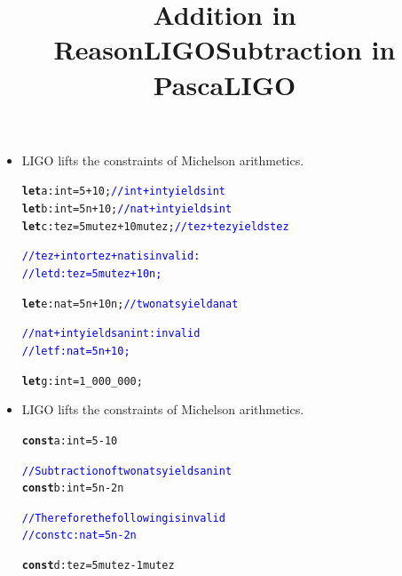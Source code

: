 \documentclass[wide]{slides}
\newcommand{\Kconst}[0]{\textbf{const}\xspace}
\newcommand{\Klet}[0]{\textbf{let}\xspace}
\newcommand{\com}[1]{\textcolor{blue}{{#1}}}
\begin{document}
\begin{slide}
  \title{Addition in ReasonLIGO}

  \begin{itemize}

    \item LIGO lifts the constraints of Michelson arithmetics.

      \begin{alltt}
\Klet a : int = 5 + 10;             \com{// int + int yields int}
\Klet b : int = 5n + 10;            \com{// nat + int yields int}
\Klet c : tez = 5mutez + 10mutez; \com{// tez + tez yields tez}

\com{// tez + int or tez + nat is invalid:}
\com{// let d : tez = 5mutez + 10n;}

\Klet e : nat = 5n + 10n;  \com{// two nats yield a nat}

\com{// nat + int yields an int: invalid}
\com{// let f : nat = 5n + 10;}

\Klet g : int = 1_000_000;
      \end{alltt}

  \end{itemize}

\end{slide}

\begin{slide}
  \title{Subtraction in PascaLIGO}

  \begin{itemize}

    \item LIGO lifts the constraints of Michelson arithmetics.

      \begin{alltt}
\Kconst a : int = 5 - 10

\com{// Subtraction of two nats yields an int}
\Kconst b : int = 5n - 2n

\com{// Therefore the following is invalid}
\com{// const c : nat = 5n - 2n}

\Kconst d : tez = 5mutez - 1mutez
      \end{alltt}

  \end{itemize}

\end{slide}
\end{document}
